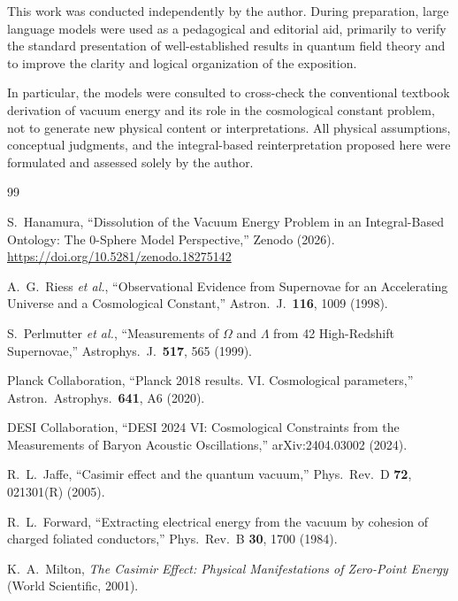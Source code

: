 \documentclass[12pt,letterpaper]{article}
\begin{document}
This work was conducted independently by the author. During preparation, large language models were used as a pedagogical and editorial aid, primarily to verify the standard presentation of well-established results in quantum field theory and to improve the clarity and logical organization of the exposition.

In particular, the models were consulted to cross-check the conventional textbook derivation of vacuum energy and its role in the cosmological constant problem, not to generate new physical content or interpretations. All physical assumptions, conceptual judgments, and the integral-based reinterpretation proposed here were formulated and assessed solely by the author.


\begin{thebibliography}{99}

S.~Hanamura,
``Dissolution of the Vacuum Energy Problem in an Integral-Based Ontology: The 0-Sphere Model Perspective,''
Zenodo (2026).
\href{https://doi.org/10.5281/zenodo.18275142}{https://doi.org/10.5281/zenodo.18275142}

A.~G.~Riess \textit{et al.},
``Observational Evidence from Supernovae for an Accelerating Universe and a Cosmological Constant,''
Astron.\ J.\ \textbf{116}, 1009 (1998).

S.~Perlmutter \textit{et al.},
``Measurements of $\Omega$ and $\Lambda$ from 42 High-Redshift Supernovae,''
Astrophys.\ J.\ \textbf{517}, 565 (1999).

Planck Collaboration,
``Planck 2018 results. VI. Cosmological parameters,''
Astron.\ Astrophys.\ \textbf{641}, A6 (2020).

DESI Collaboration,
``DESI 2024 VI: Cosmological Constraints from the Measurements of Baryon Acoustic Oscillations,''
arXiv:2404.03002 (2024).

R.~L.~Jaffe,
``Casimir effect and the quantum vacuum,''
Phys.\ Rev.\ D \textbf{72}, 021301(R) (2005).

R.~L.~Forward,
``Extracting electrical energy from the vacuum by cohesion of charged foliated conductors,''
Phys.\ Rev.\ B \textbf{30}, 1700 (1984).

K.~A.~Milton,
\textit{The Casimir Effect: Physical Manifestations of Zero-Point Energy}
(World Scientific, 2001).


\end{thebibliography}
\end{document}
